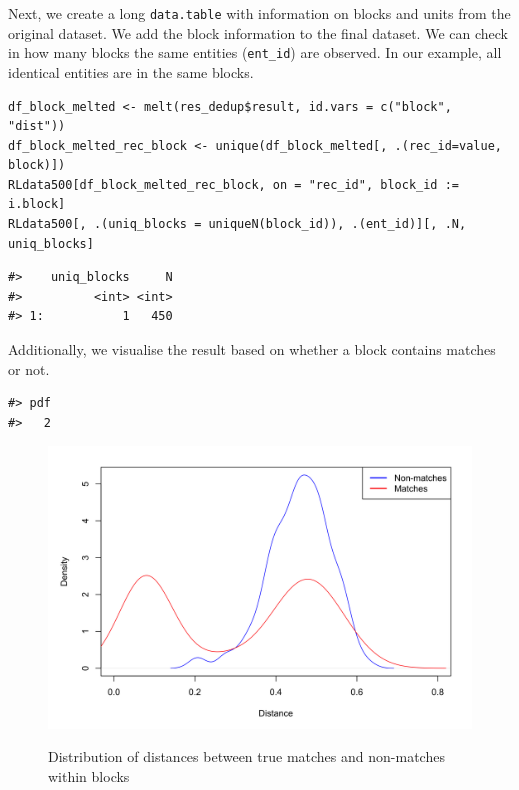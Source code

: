 Next, we create a long \texttt{data.table} with information on blocks and units
from the original dataset. We add the block information to the final
dataset. We can check in how many blocks the same entities (\texttt{ent\_id})
are observed. In our example, all identical entities are in the same
blocks.

\begin{verbatim}
df_block_melted <- melt(res_dedup$result, id.vars = c("block", "dist"))
df_block_melted_rec_block <- unique(df_block_melted[, .(rec_id=value, block)])
RLdata500[df_block_melted_rec_block, on = "rec_id", block_id := i.block]
RLdata500[, .(uniq_blocks = uniqueN(block_id)), .(ent_id)][, .N, uniq_blocks]
\end{verbatim}

\begin{verbatim}
#>    uniq_blocks     N
#>          <int> <int>
#> 1:           1   450
\end{verbatim}

Additionally, we visualise the result based on whether a
block contains matches or not.

\begin{verbatim}
#> pdf 
#>   2
\end{verbatim}

\begin{figure}
\includegraphics[width=0.8\linewidth,height=0.3\textheight,alt={A density plot of distances between units that are true matches (red) and non-matches (blue) within blocks created by the \CRANpkg{blocking}. The distribution of distance for matches is bimodal. There is a group of units that are true matches where the distance between them is small (less than 0.2), whilst for the second group, the distance is similar to true non-matches (between 0.4 and 0.6). This distance may be used as additional information for deduplication (and record linkage) studies.}]{./figures/fig-1-density} \caption{Distribution of distances between true matches and non-matches within blocks}\label{fig:penguins-alison}
\end{figure}

